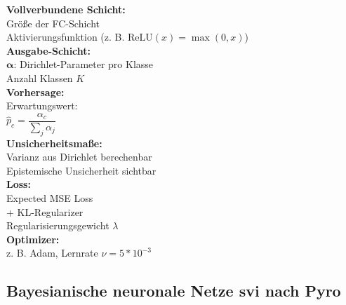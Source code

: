 \begin{center}
\begin{minipage}[t]{0.48\textwidth}
\textbf{Vollverbundene Schicht:} \\
Größe der FC-Schicht \\
Aktivierungsfunktion (z. B. $\text{ReLU}(x) = \max(0, x)$) \\[4pt]

\textbf{Ausgabe-Schicht:} \\
$\boldsymbol{\alpha}$: Dirichlet-Parameter pro Klasse \\
Anzahl Klassen $K$ \\[4pt]

\textbf{Vorhersage:} \\
Erwartungswert: \\
$\hat{p}_c = \dfrac{\alpha_c}{\sum_j \alpha_j}$ \\[4pt]

\textbf{Unsicherheitsmaße:} \\
Varianz aus Dirichlet berechenbar \\
Epistemische Unsicherheit sichtbar \\[4pt]

\textbf{Loss:} \\
Expected MSE Loss \\
+ KL-Regularizer \\
Regularisierungsgewicht $\lambda$ \\[4pt]

\textbf{Optimizer:} \\
z. B. Adam, Lernrate $\nu = 5 * 10^{-3}$
\end{minipage}
\end{center}

\newpage



\subsection*{\gls{Bayesianische neuronale Netze} \gls{svi} nach Pyro \parencite{PyroPplDevelopers.2024}}

\par\noindent\\

